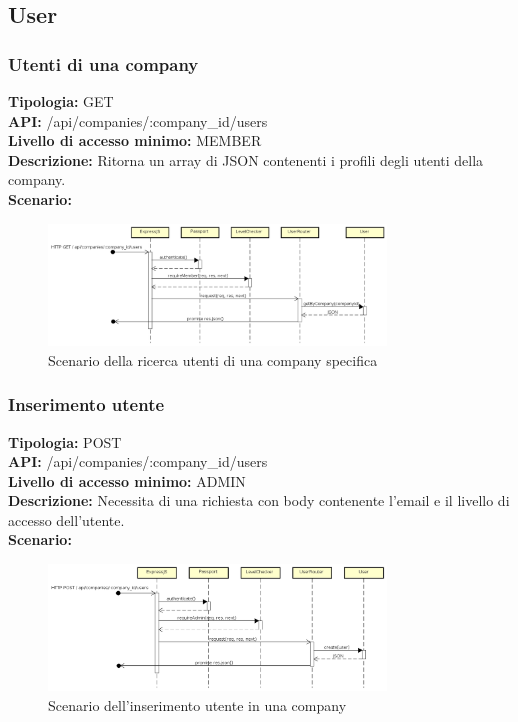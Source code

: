 \newpage
\subsection{User}
\subsubsection{Utenti di una company}
\textbf{Tipologia:} GET \\
\textbf{API:} /api/companies/:company\_id/users \\
\textbf{Livello di accesso minimo:} MEMBER \\
\textbf{Descrizione:} Ritorna un array di JSON contenenti i profili degli utenti della company. \\
\textbf{Scenario:} 
\begin{figure}[h]
\centering
\includegraphics[width=0.8\textwidth]{res/sections/backend/(GET)user.png}
\caption{Scenario della ricerca utenti di una company specifica}
\end{figure}

\newpage
\subsubsection{Inserimento utente}
\textbf{Tipologia:} POST \\
\textbf{API:} /api/companies/:company\_id/users \\
\textbf{Livello di accesso minimo:} ADMIN \\
\textbf{Descrizione:} Necessita di una richiesta con body contenente l'email e il livello di accesso dell'utente.\\
\textbf{Scenario:} 
\begin{figure}[h]
\centering
\includegraphics[width=0.8\textwidth]{res/sections/backend/(POST)user.png}
\caption{Scenario dell'inserimento utente in una company}
\end{figure}

